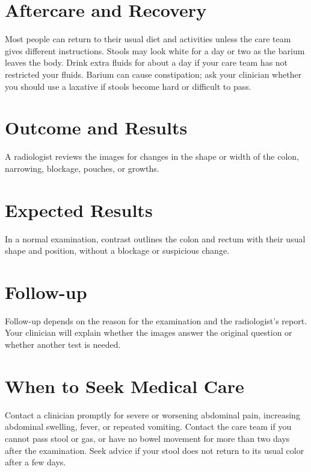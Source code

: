 \section*{Aftercare and Recovery}
Most people can return to their usual diet and activities unless the care team gives different instructions. Stools may look white for a day or two as the barium leaves the body. Drink extra fluids for about a day if your care team has not restricted your fluids. Barium can cause constipation; ask your clinician whether you should use a laxative if stools become hard or difficult to pass.

\section*{Outcome and Results}
A radiologist reviews the images for changes in the shape or width of the colon, narrowing, blockage, pouches, or growths.

\section*{Expected Results}
In a normal examination, contrast outlines the colon and rectum with their usual shape and position, without a blockage or suspicious change.

\section*{Follow-up}
Follow-up depends on the reason for the examination and the radiologist's report. Your clinician will explain whether the images answer the original question or whether another test is needed.

\section*{When to Seek Medical Care}
Contact a clinician promptly for severe or worsening abdominal pain, increasing abdominal swelling, fever, or repeated vomiting. Contact the care team if you cannot pass stool or gas, or have no bowel movement for more than two days after the examination. Seek advice if your stool does not return to its usual color after a few days.

